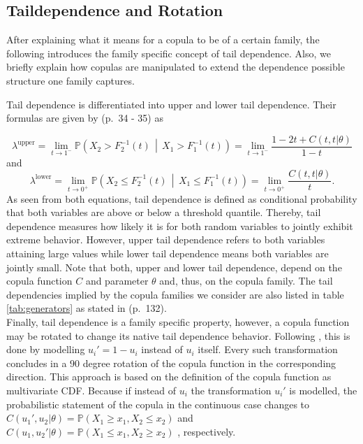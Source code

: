 \documentclass[
]{krantz}
\begin{document}
\subsection{Taildependence and Rotation}\label{taildep}

After explaining what it means for a copula to be of a certain family,
the following introduces the family specific concept of tail dependence.
Also, we briefly explain how copulas are manipulated to extend the dependence possible structure one family
captures.

Tail dependence is differentiated into upper and lower tail dependence.
Their formulas are given by \citet{czado2019} (p.~34 - 35) as

\[
\lambda^{\text{upper}} = \lim_{t \to 1^{-}} \mathbb{P}\left( X_2 > F_2^{-1}(t) \,\middle|\, X_1 > F_1^{-1}(t) \right) = \lim_{t \to 1^{-}} \frac{1 - 2t + C(t, t|\theta)}{1 - t}
\label{eq:uppertaildep}
\]
and
\[
\lambda^{\text{lower}} = \lim_{t \to 0^{+}} \mathbb{P}\left( X_2 \leq F_2^{-1}(t) \,\middle|\, X_1 \leq F_1^{-1}(t) \right) 
= \lim_{t \to 0^{+}} \frac{C(t, t|\theta)}{t}.
\label{eq:lowertaildep}
\]
As seen from both equations, tail dependence is defined as conditional probability that both variables are above
or below a threshold quantile.
Thereby, tail dependence
measures how likely it is for both random variables to jointly exhibit extreme behavior.
However, upper tail dependence refers to both variables attaining large values while lower tail dependence means
both variables are jointly small.
Note that both, upper and lower tail dependence, depend on the copula function \(C\) and parameter \(\theta\) and, thus, on the copula
family. The tail dependencies implied by the copula families we consider are also listed in
table \ref{tab:generators} as stated in \citet{zhang2019} (p.~132).\\
Finally, tail dependence is a family specific property, however, a copula function may be rotated to
change its native tail dependence behavior.
Following \citet{pan2024}, this is done by modelling \(u_i' = 1 - u_i\) instead of \(u_i\) itself.
Every such transformation concludes in a \(90\) degree rotation of the copula function in the corresponding
direction. This approach is based on the definition of the copula function as multivariate CDF.
Because if instead of \(u_i\) the transformation \(u_i'\) is modelled,
the probabilistic statement of the copula in the continuous case changes to
\(C(u_1', u_2|\theta) =  \mathbb{P}(X_1 \geq x_1,X_2 \leq x_2)\) and
\(C(u_1, u_2'|\theta) =  \mathbb{P}(X_1 \leq x_1,X_2 \geq x_2)\)
, respectively.
\end{document}
